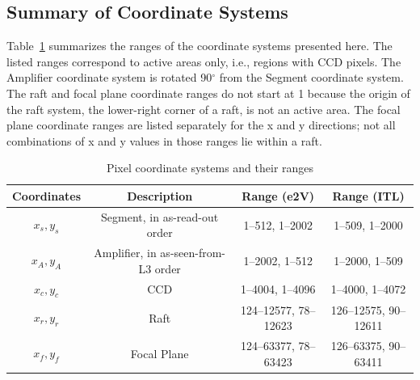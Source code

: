 \documentclass{article}[12pt]
\begin{document}
\subsection{Summary of Coordinate Systems}
Table~\ref{tab:coords} summarizes the ranges of the coordinate systems presented here.  The listed ranges correspond to active areas only, i.e., regions with CCD pixels.  The Amplifier coordinate system is rotated 90$^\circ$ from the Segment coordinate system.  The raft and focal plane coordinate ranges do not start at 1 because the origin of the raft system, the lower-right corner of a raft, is not an active area.  The focal plane coordinate ranges are listed separately for the x and y directions; not all combinations of x and y values in those ranges lie within a raft.



\begin{table}
\begin{centering}
\begin{tabular}{| c | c | c | c |}
\hline
{\bf Coordinates} & {\bf Description} & {\bf Range (e2V)} & {\bf Range (ITL)}  \\
\hline
$x_s, y_s$ & Segment, in as-read-out order & 1--512, 1--2002 & 1--509, 1--2000  \\
$x_A, y_A$ & Amplifier, in as-seen-from-L3 order & 1--2002, 1--512  & 1--2000, 1--509 \\
$x_c, y_c$ & CCD & 1--4004, 1--4096 & 1--4000, 1--4072  \\
$x_r, y_r$ & Raft & 124--12577, 78--12623  & 126--12575, 90--12611 \\
$x_f, y_f$ & Focal Plane & 124--63377, 78--63423 & 126--63375, 90--63411 \\
\hline
\end{tabular}
\caption{Pixel coordinate systems and their ranges \label{tab:coords}}
\end{centering}
\end{table}
\end{document}
